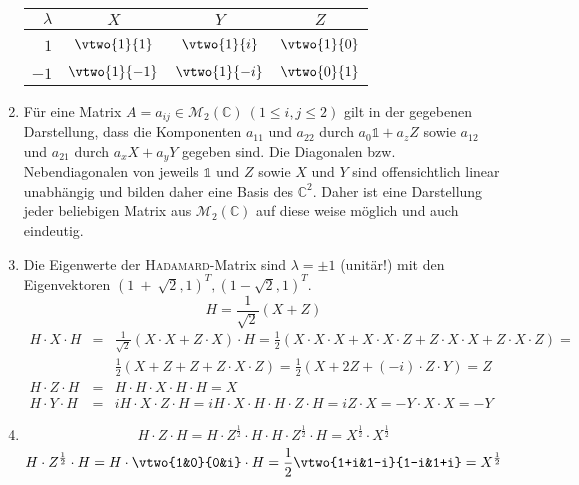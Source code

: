 \begin{enumerate}
                        \begin{center}
                        \begin{tabular}{r|c|c|c}
                                $\lambda$ & $X$ & $Y$ & $Z$ \\
                                \hline
                                &&&\\
                                $1$& $\vtwo{1}{1}$ & $\vtwo{1}{i}$ & $\vtwo{1}{0}$ \\[0.6em]
                                &&&\\
                                $-1$& $\vtwo{1}{-1}$ & $\vtwo{1}{-i}$ & $\vtwo{0}{1}$
                        \end{tabular}
                        \end{center}
                \twoend
        \item Für eine Matrix $A = a_{ij} \in \mathcal{M}_2(\mathds{C}) \ (1
              \leq i, j \leq 2)$ gilt in der gegebenen Darstellung, dass die Komponenten
              $a_{11}$ und $a_{22}$ durch $a_0 \mathds{1} + a_z Z$ sowie $a_{12}$ und
              $a_{21}$ durch $a_xX + a_yY$ gegeben sind. Die Diagonalen bzw. Nebendiagonalen
              von jeweils $\mathds{1}$ und $Z$ sowie $X$ und $Y$ sind offensichtlich linear
              unabhängig und bilden daher eine Basis des $\mathds{C}^2$. Daher ist eine
              Darstellung jeder beliebigen Matrix aus $\mathcal{M}_2(\mathds{C})$ auf diese
              weise möglich und auch eindeutig.
        \item Die Eigenwerte der \textsc{Hadamard}-Matrix sind $\lambda = \pm
              1$ (unitär!) mit den Eigenvektoren $(1~+~\sqrt{2}, 1)^T, (1-\sqrt{2}, 1)^T$.
              \[ H = \frac{1}{\sqrt{2}} (X + Z) \]
              \begin{eqnarray*}
              H\cdot X\cdot H &=& \frac{1}{\sqrt{2}} (X\cdot X + Z\cdot X)
              \cdot H = \frac{1}{2} (X\cdot X\cdot X + X\cdot X\cdot Z + Z\cdot X\cdot X +
              Z\cdot X\cdot Z) = \\
              &&\frac{1}{2} (X + Z + Z + Z\cdot X \cdot Z) = \frac{1}{2} (X
              + 2Z + (-i)\cdot Z\cdot Y) = Z \\
              H\cdot Z\cdot H &=& H \cdot H \cdot X \cdot H \cdot H = X \\
              H\cdot Y\cdot H &=& i H\cdot X\cdot Z\cdot H = i H\cdot X \cdot H \cdot H \cdot Z \cdot H = i Z\cdot X = -Y\cdot X\cdot X = -Y
              \end{eqnarray*}
        \item \[ H\cdot Z\cdot H = H\cdot Z^{\frac{1}{2}}\cdot H\cdot H\cdot Z^{\frac{1}{2}}\cdot H = X^{\frac{1}{2}}\cdot X^{\frac{1}{2}} \]
              \[ H\cdot Z^{\frac{1}{2}}\cdot H = H\cdot \vtwo{1&0}{0&i}\cdot H = \frac{1}{2}\vtwo{1+i&1-i}{1-i&1+i} = X^{\frac{1}{2}} \]
\end{enumerate}
